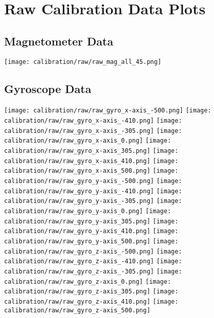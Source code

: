 \chapter{Raw Calibration Data Plots} 

\section{Magnetometer Data}
\texttt{[image: calibration/raw/raw\_mag\_all\_45.png]}

\section{Gyroscope Data}
\texttt{[image: calibration/raw/raw\_gyro\_x-axis\_-500.png]}
\texttt{[image: calibration/raw/raw\_gyro\_x-axis\_-410.png]}
\texttt{[image: calibration/raw/raw\_gyro\_x-axis\_-305.png]}
\texttt{[image: calibration/raw/raw\_gyro\_x-axis\_0.png]}
\texttt{[image: calibration/raw/raw\_gyro\_x-axis\_305.png]}
\texttt{[image: calibration/raw/raw\_gyro\_x-axis\_410.png]}
\texttt{[image: calibration/raw/raw\_gyro\_x-axis\_500.png]}
\texttt{[image: calibration/raw/raw\_gyro\_y-axis\_-500.png]}
\texttt{[image: calibration/raw/raw\_gyro\_y-axis\_-410.png]}
\texttt{[image: calibration/raw/raw\_gyro\_y-axis\_-305.png]}
\texttt{[image: calibration/raw/raw\_gyro\_y-axis\_0.png]}
\texttt{[image: calibration/raw/raw\_gyro\_y-axis\_305.png]}
\texttt{[image: calibration/raw/raw\_gyro\_y-axis\_410.png]}
\texttt{[image: calibration/raw/raw\_gyro\_y-axis\_500.png]}
\texttt{[image: calibration/raw/raw\_gyro\_z-axis\_-500.png]}
\texttt{[image: calibration/raw/raw\_gyro\_z-axis\_-410.png]}
\texttt{[image: calibration/raw/raw\_gyro\_z-axis\_-305.png]}
\texttt{[image: calibration/raw/raw\_gyro\_z-axis\_0.png]}
\texttt{[image: calibration/raw/raw\_gyro\_z-axis\_305.png]}
\texttt{[image: calibration/raw/raw\_gyro\_z-axis\_410.png]}
\texttt{[image: calibration/raw/raw\_gyro\_z-axis\_500.png]}

